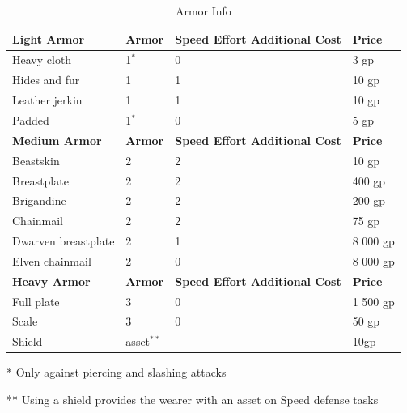 \begin{table}[h]
\begin{threeparttable}
\caption{Armor Info}
\label{tab:Armor Info}
\centering
\begin{tabularx}{\textwidth} { | Y | Y | Y | Y | }
\hline
\textbf{Light Armor} & \textbf{Armor} & \textbf{Speed Effort Additional Cost} & \textbf{Price}  \\ \hline
Heavy cloth & 1$^{*}$ & 0 & 3 gp \\ \hline
Hides and fur & 1 & 1 & 10 gp \\ \hline
Leather jerkin & 1 & 1 & 10 gp \\ \hline
Padded & 1$^{*}$ & 0 & 5 gp \\ \hline
\textbf{Medium Armor} & \textbf{Armor} & \textbf{Speed Effort Additional Cost} & \textbf{Price} \\ \hline
Beastskin & 2 & 2 & 10 gp \\ \hline
Breastplate & 2 & 2 & 400 gp \\ \hline
Brigandine & 2 & 2 & 200 gp \\ \hline
Chainmail & 2 & 2 & 75 gp \\ \hline
Dwarven breastplate & 2 & 1 & 8 000 gp \\ \hline
Elven chainmail & 2 & 0 & 8 000 gp \\ \hline
\textbf{Heavy Armor} & \textbf{Armor} & \textbf{Speed Effort Additional Cost} & \textbf{Price} \\ \hline
Full plate & 3 & 0 & 1 500 gp \\ \hline
Scale & 3 & 0 & 50 gp \\ \hline
Shield & asset$^{**}$ & ~ & 10gp \\ \hline
\end{tabularx}
\begin{tablenotes}
\item[*] Only against piercing and slashing attacks 
\item[**] Using a shield provides the wearer with an asset on Speed defense tasks
\end{tablenotes}
\end{threeparttable}
\end{table}

